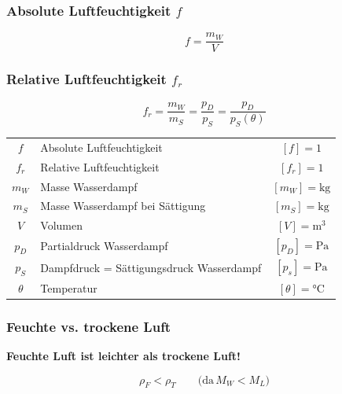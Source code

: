 \subsubsection{Absolute Luftfeuchtigkeit  $f$}

$$ \boxed{ f = \frac{m_W}{V}  } $$



\subsubsection{Relative Luftfeuchtigkeit $f_r$}

$$ \boxed{ f_r = \frac{m_W}{m_S} = \frac{p_D}{p_S} = \frac{p_D}{p_S(\theta)}  } $$






\begin{tabular}{c l c}
	$f$ & Absolute Luftfeuchtigkeit & $[f] = 1$ \\
	$f_r$ & Relative Luftfeuchtigkeit & $[f_r] = 1$ \\
	$m_W$ & Masse Wasserdampf & $[m_W] = \mathrm{kg}$ \\
	$m_S$ & Masse Wasserdampf bei Sättigung & $[m_S] = \mathrm{kg}$ \\
	$V$ & Volumen & $[V] = \mathrm{m^3}$ \\
	$p_D$ & Partialdruck Wasserdampf & $[p_D] = \mathrm{Pa}$ \\
	$p_S$ & Dampfdruck = Sättigungsdruck Wasserdampf & $[p_s] = \mathrm{Pa}$ \\
	$\theta$ & Temperatur & $[\theta] = \text{°C}$ \\
	
\end{tabular}


\vfill\null
\columnbreak



\subsubsection{Feuchte vs. trockene Luft}

\textbf{Feuchte Luft ist leichter als trockene Luft!}

$$ \boxed{ \rho_F < \rho_T } \qquad \mathrm{(da} \, M_W < M_L \mathrm{)}$$


